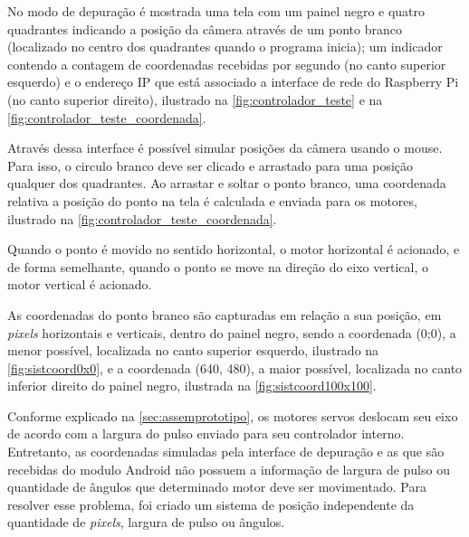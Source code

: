 No modo de depuração é mostrada uma tela com um painel negro e quatro quadrantes indicando a posição da câmera através de um ponto branco (localizado no centro dos quadrantes quando o programa inicia); um indicador contendo a contagem de coordenadas recebidas por segundo (no canto superior esquerdo) e o endereço IP que está associado a interface de rede do Raspberry Pi (no canto superior direito), ilustrado na \autoref{fig:controlador_teste} e na \autoref{fig:controlador_teste_coordenada}. \par

Através dessa interface é possível simular posições da câmera usando o mouse. Para isso, o circulo branco deve ser clicado e arrastado para uma posição qualquer dos quadrantes. Ao arrastar e soltar o ponto branco, uma coordenada relativa a posição do ponto na tela é calculada e enviada para os motores, ilustrado na \autoref{fig:controlador_teste_coordenada}.\par

Quando o ponto é movido no sentido horizontal, o motor horizontal é acionado, e de forma semelhante, quando o ponto se move na direção do eixo vertical, o motor vertical é acionado.\par

As coordenadas do ponto branco são capturadas em relação a sua posição, em \textit{pixels} horizontais e verticais, dentro do painel negro, sendo a coordenada (0;0), a menor possível, localizada no canto superior esquerdo, ilustrado na \autoref{fig:sistcoord0x0}, e a coordenada (640, 480), a maior possível, localizada no canto inferior direito do painel negro, ilustrada na \autoref{fig:sistcoord100x100}.\par

Conforme explicado na \autoref{sec:assemprototipo}, os motores servos deslocam seu eixo de acordo com a largura do pulso enviado para seu controlador interno. Entretanto, as coordenadas simuladas pela interface de depuração e as que são recebidas do modulo Android não possuem a informação de largura de pulso ou quantidade de ângulos que determinado motor deve ser movimentado. Para resolver esse problema, foi criado um sistema de posição independente da quantidade de \textit{pixels}, largura de pulso ou ângulos.\par

